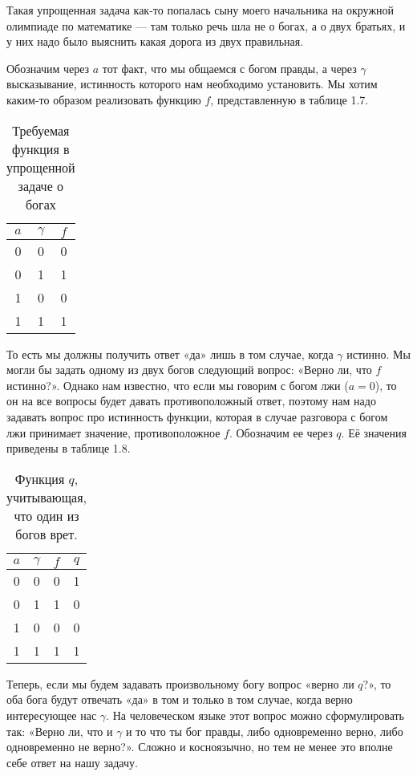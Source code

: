 Такая упрощенная задача как-то попалась сыну моего начальника на окружной олимпиаде по математике — там только речь шла не о богах, а о двух братьях, и у них надо было выяснить какая дорога из двух правильная.

Обозначим через $a$ тот факт, что мы общаемся с богом правды, а через $\gamma$ высказывание, истинность которого нам необходимо установить. Мы хотим каким-то образом реализовать функцию $f$, представленную в таблице 1.7.

\begin{table}[h]
\centering
\begin{tabular}{cc|c}
$a$&$\gamma$&$f$\\
\hline
0&0&0 \\
0&1&1 \\
1&0&0 \\
1&1&1
\end{tabular}
\caption{Требуемая функция в упрощенной задаче о богах}
\end{table}

То есть мы должны получить ответ «да» лишь в том случае, когда $\gamma$ истинно. Мы могли бы задать одному из двух богов следующий вопрос: «Верно ли, что $f$ истинно?». Однако нам известно, что если мы говорим с богом лжи ($a = 0$), то он на все вопросы будет давать противоположный ответ, поэтому нам надо задавать вопрос про истинность функции, которая в случае разговора с богом лжи принимает значение, противоположное $f$. Обозначим ее через $q$. Её значения приведены в таблице 1.8.

\begin{table}[h]
\centering
\begin{tabular}{cc|cc}
$a$&$\gamma$&$f$&$q$ \\
\hline
0&0&0&1\\
0&1&1&0\\
1&0&0&0\\
1&1&1&1
\end{tabular}
\caption{Функция $q$, учитывающая, что один из богов врет.}
\end{table}

Теперь, если мы будем задавать произвольному богу вопрос «верно ли $q$?», то оба бога будут отвечать «да» в том и только в том случае, когда верно интересующее нас $\gamma$. На человеческом языке этот вопрос можно сформулировать так: «Верно ли, что и $\gamma$ и то что ты бог правды, либо одновременно верно, либо одновременно не верно?». Сложно и косноязычно, но тем не менее это вполне себе ответ на нашу задачу.

